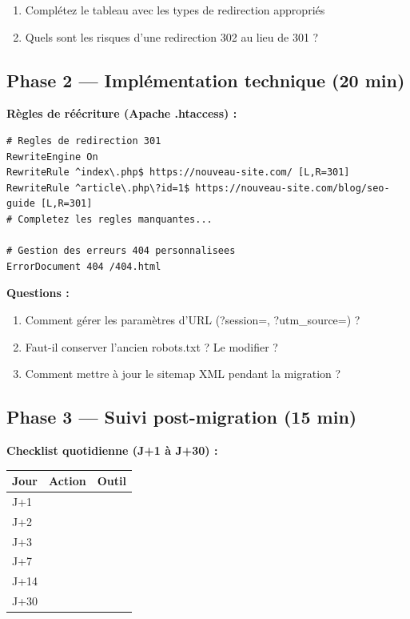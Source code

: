 \documentclass[12pt,a4paper]{report}
\begin{document}
\begin{enumerate}
\item Complétez le tableau avec les types de redirection appropriés
\item Quels sont les risques d'une redirection 302 au lieu de 301 ?
\end{enumerate}

\subsection{Phase 2 --- Implémentation technique (20 min)}

\textbf{Règles de réécriture (Apache .htaccess) :}
\begin{lstlisting}
# Regles de redirection 301
RewriteEngine On
RewriteRule ^index\.php$ https://nouveau-site.com/ [L,R=301]
RewriteRule ^article\.php\?id=1$ https://nouveau-site.com/blog/seo-guide [L,R=301]
# Completez les regles manquantes...

# Gestion des erreurs 404 personnalisees
ErrorDocument 404 /404.html
\end{lstlisting}

\textbf{Questions :}
\begin{enumerate}
\item Comment gérer les paramètres d'URL (?session=, ?utm\_source=) ?
\item Faut-il conserver l'ancien robots.txt ? Le modifier ?
\item Comment mettre à jour le sitemap XML pendant la migration ?
\end{enumerate}

\subsection{Phase 3 --- Suivi post-migration (15 min)}

\textbf{Checklist quotidienne (J+1 à J+30) :}

\begin{longtable}{|l|l|l|}
\hline
\textbf{Jour} & \textbf{Action} & \textbf{Outil} \\
\hline
J+1 & & \\
\hline
J+2 & & \\
\hline
J+3 & & \\
\hline
J+7 & & \\
\hline
J+14 & & \\
\hline
J+30 & & \\
\hline
\end{longtable}
\end{document}
